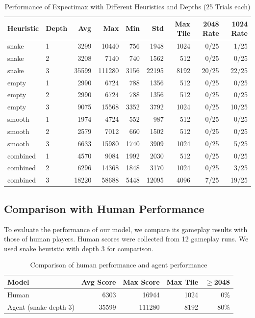 \documentclass{article}
\begin{document}
\begin{table}[h]
\centering
\begin{tabular}{llrrrrrrr}
\toprule
Heuristic & Depth & Avg & Max & Min & Std & Max Tile & 2048 Rate & 1024 Rate \\
\midrule

snake & 1 & 3299 & 10440 & 756 & 1948 & 1024 & 0/25 & 1/25 \\
snake & 2 & 3208 & 7140 & 740 & 1562 & 512 & 0/25 & 0/25 \\
snake & 3 & 35599 & 111280 & 3156 & 22195 & 8192 & 20/25 & 22/25 \\

\midrule
empty & 1 & 2990 & 6724 & 788 & 1356 & 512 & 0/25 & 0/25 \\
empty & 2 & 2990 & 6724 & 788 & 1356 & 512 & 0/25 & 0/25 \\
empty & 3 & 9075 & 15568 & 3352 & 3792 & 1024 & 0/25 & 10/25 \\

\midrule
smooth & 1 & 1974 & 4724 & 552 & 987 & 512 & 0/25 & 0/25 \\
smooth & 2 & 2579 & 7012 & 660 & 1502 & 512 & 0/25 & 0/25 \\
smooth & 3 & 6633 & 15980 & 1740 & 3909 & 1024 & 0/25 & 5/25 \\

\midrule
combined & 1 & 4570 & 9084 & 1992 & 2030 & 512 & 0/25 & 0/25 \\
combined & 2 & 6296 & 14368 & 1848 & 3170 & 1024 & 0/25 & 3/25 \\
combined & 3 & 18220 & 58688 & 5448 & 12095 & 4096 & 7/25 & 19/25 \\

\bottomrule
\end{tabular}
\caption{Performance of Expectimax with Different Heuristics and Depths (25 Trials each)}
\end{table}

\subsection{Comparison with Human Performance}

To evaluate the performance of our model, we compare its gameplay results with those of human players.
Human scores were collected from 12 gameplay runs. We used snake heuristic with depth 3 for comparison.

\begin{table}[h]
\centering
\begin{tabular}{lrrrr}
\toprule
Model & Avg Score & Max Score & Max Tile & $\geq$2048 \\
\midrule
Human & 6303 & 16944 & 1024 & 0\% \\
Agent (snake depth 3) & 35599 & 111280 & 8192 & 80\% \\
\bottomrule
\end{tabular}
\caption{Comparison of human performance and agent performance}
\end{table}
\end{document}
